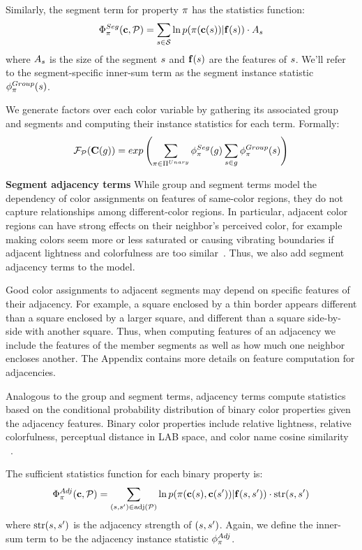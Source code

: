 Similarly, the segment term for property $\pi$ has the statistics function:
 \begin{equation*}
 \Phi^{Seg}_\pi(\mathbf{c}, \mathcal{P}) = \sum_{s \in \mathcal{S}} \ln p( \pi( \mathbf{c}(s) ) | \mathbf{f}(s)) \cdot A_s
 \end{equation*}
where $A_s$ is the size of the segment $s$ and $\mathbf{f}(s)$ are the features of $s$. We'll refer to the segment-specific inner-sum term as the segment instance statistic $\phi^{Group}_\pi(s)$.

We generate factors over each color variable by gathering its associated group and segments and computing their instance statistics for each term. Formally:
 \begin{equation*}
 \mathcal{F}_{\mathcal{P}}(\mathbf{C}(g)) = exp\left(\sum_{\pi \in \Pi^{Unary}} \phi^{Seg}_\pi(g) \sum_{s \in g} \phi^{Group}_\pi(s)\right) 
 \end{equation*}

\textbf{Segment adjacency terms}
While group and segment terms model the dependency of color assignments on features of same-color regions, they do not capture relationships among different-color regions. In particular, adjacent color regions can have strong effects on their neighbor's perceived color, for example making colors seem more or less saturated or causing vibrating boundaries if adjacent lightness and colorfulness are too similar~\cite{AlbersInteractionOfColor}. Thus, we also add segment adjacency terms to the model.

Good color assignments to adjacent segments may depend on specific features of their adjacency. For example, a square enclosed by a thin border appears different than a square enclosed by a larger square, and different than a square side-by-side with another square. Thus, when computing features of an adjacency we include the features of the member segments as well as how much one neighbor encloses another. The Appendix contains more details on feature computation for adjacencies. 

Analogous to the group and segment terms, adjacency terms compute statistics based on the conditional probability distribution of binary color properties given the adjacency features. Binary color properties include relative lightness, relative colorfulness, perceptual distance in LAB space, and color name cosine similarity ~\cite{ColorNamingModels}.

The sufficient statistics function for each binary property is:
 \begin{equation*}
 \Phi^{Adj}_\pi(\mathbf{c}, \mathcal{P}) =
 	\sum_{(s, s^{\prime}) \in \text{adj}(\mathcal{P})}
 		\ln p( \pi( \mathbf{c}(s), \mathbf{c}(s^{\prime}) ) | \mathbf{f}(s, s^{\prime}) ) \cdot \text{str}(s, s^{\prime}) 
 \end{equation*}
 where $\text{str}(s,s^{\prime})$ is the adjacency strength of $(s,s^{\prime})$. Again, we define the inner-sum term to be the adjacency instance statistic $\phi^{Adj}_\pi$.

